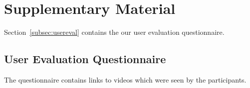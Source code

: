 \section{Supplementary Material}
\label{sec:sm}
Section~\ref{subsec:usereval} contains the our user evaluation questionnaire.
\subsection{User Evaluation Questionnaire}
The questionnaire contains links to videos which were seen by the participants.
\label{subsec:usereval}

